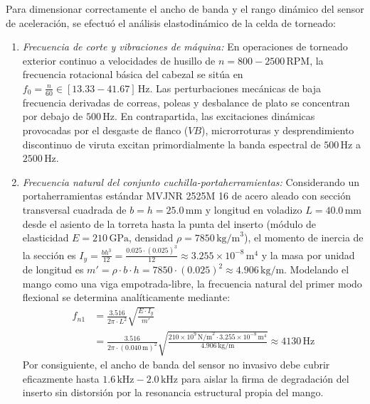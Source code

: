 Para dimensionar correctamente el ancho de banda y el rango dinámico del sensor de aceleración, se efectuó el análisis elastodinámico de la celda de torneado:

\begin{enumerate}
    \item \textit{Frecuencia de corte y vibraciones de máquina:} En operaciones de torneado exterior continuo a velocidades de husillo de $n = 800 - 2500\,\text{RPM}$, la frecuencia rotacional básica del cabezal se sitúa en $f_0 = \frac{n}{60} \in [13.33 - 41.67]\,\text{Hz}$. Las perturbaciones mecánicas de baja frecuencia derivadas de correas, poleas y desbalance de plato se concentran por debajo de $500\,\text{Hz}$. En contrapartida, las excitaciones dinámicas provocadas por el desgaste de flanco ($VB$), microrroturas y desprendimiento discontinuo de viruta excitan primordialmente la banda espectral de $500\,\text{Hz}$ a $2500\,\text{Hz}$.
    
    \item \textit{Frecuencia natural del conjunto cuchilla-portaherramientas:} Considerando un portaherramientas estándar MVJNR 2525M 16 de acero aleado con sección transversal cuadrada de $b = h = 25.0\,\text{mm}$ y longitud en voladizo $L = 40.0\,\text{mm}$ desde el asiento de la torreta hasta la punta del inserto (módulo de elasticidad $E = 210\,\text{GPa}$, densidad $\rho = 7850\,\text{kg/m}^3$), el momento de inercia de la sección es $I_y = \frac{b h^3}{12} = \frac{0.025 \cdot (0.025)^3}{12} \approx 3.255 \times 10^{-8}\,\text{m}^4$ y la masa por unidad de longitud es $m' = \rho \cdot b \cdot h = 7850 \cdot (0.025)^2 \approx 4.906\,\text{kg/m}$. Modelando el mango como una viga empotrada-libre, la frecuencia natural del primer modo flexional se determina analíticamente mediante:
    \begin{equation}
    \begin{split}
    f_{n1} &= \frac{3.516}{2\pi \cdot L^2} \sqrt{\frac{E \cdot I_y}{m'}} \\
    &= \frac{3.516}{2\pi \cdot (0.040\,\text{m})^2} \sqrt{\frac{210 \times 10^9\,\text{N/m}^2 \cdot 3.255 \times 10^{-8}\,\text{m}^4}{4.906\,\text{kg/m}}} \approx 4130\,\text{Hz}
    \end{split}
    \label{eq:mp_frecuencia_natural_torreta}
    \end{equation}
    Por consiguiente, el ancho de banda del sensor no invasivo debe cubrir eficazmente hasta $1.6\,\text{kHz} - 2.0\,\text{kHz}$ para aislar la firma de degradación del inserto sin distorsión por la resonancia estructural propia del mango.


\end{enumerate}
